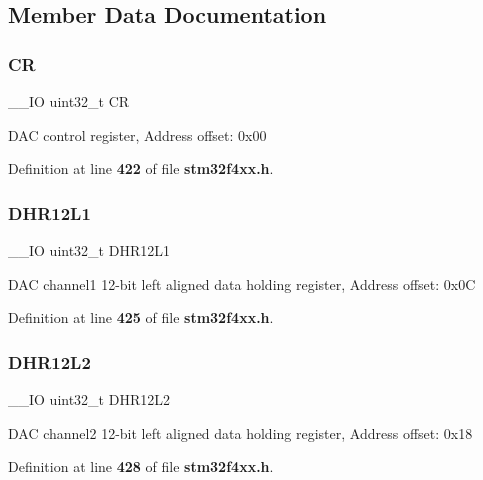 \subsection{Member Data Documentation}
\mbox{\label{structDAC__TypeDef_ab40c89c59391aaa9d9a8ec011dd0907a}} 
\subsubsection{CR}
{\footnotesize\ttfamily \+\_\+\+\_\+\+IO uint32\+\_\+t CR}

D\+AC control register, Address offset\+: 0x00 

Definition at line \textbf{ 422} of file \textbf{ stm32f4xx.\+h}.

\mbox{\label{structDAC__TypeDef_ae9028b8bcb5118b7073165fb50fcd559}} 
\subsubsection{D\+H\+R12\+L1}
{\footnotesize\ttfamily \+\_\+\+\_\+\+IO uint32\+\_\+t D\+H\+R12\+L1}

D\+AC channel1 12-\/bit left aligned data holding register, Address offset\+: 0x0C 

Definition at line \textbf{ 425} of file \textbf{ stm32f4xx.\+h}.

\mbox{\label{structDAC__TypeDef_a2e45f9c9d67e384187b25334ba0a3e3d}} 
\subsubsection{D\+H\+R12\+L2}
{\footnotesize\ttfamily \+\_\+\+\_\+\+IO uint32\+\_\+t D\+H\+R12\+L2}

D\+AC channel2 12-\/bit left aligned data holding register, Address offset\+: 0x18 

Definition at line \textbf{ 428} of file \textbf{ stm32f4xx.\+h}.

\mbox{\label{structDAC__TypeDef_acc269320aff0a6482730224a4b641a59}} 
